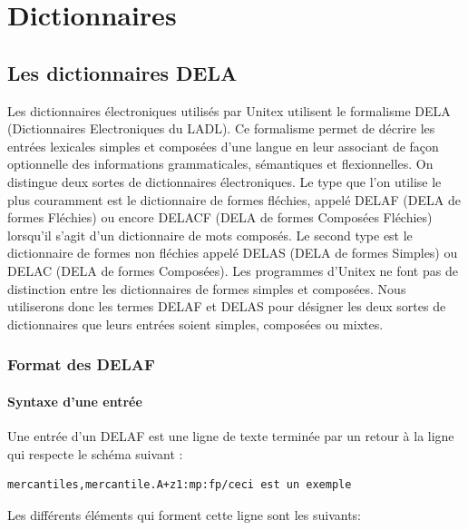 \chapter{Dictionnaires}
\label{chap-dictionaries}

\section{Les dictionnaires DELA}

Les dictionnaires électroniques utilisés par Unitex utilisent le formalisme DELA (Dictionnaires
Electroniques du LADL). Ce formalisme permet de décrire les entrées lexicales simples et composées
 d’une langue en leur associant de façon optionnelle des
informations grammaticales, sémantiques et flexionnelles. On distingue deux sortes de dictionnaires
électroniques. Le type que l’on utilise le plus couramment est le dictionnaire de formes fléchies,
appelé DELAF (DELA de formes Fléchies) ou encore DELACF (DELA de formes Composées
Fléchies) lorsqu’il s’agit d’un dictionnaire de mots composés.
Le second type est le dictionnaire de formes non fléchies appelé DELAS (DELA de formes Simples)
ou DELAC (DELA de formes Composées).
Les programmes d’Unitex ne font pas de distinction entre les dictionnaires de formes
simples et composées. Nous utiliserons donc les termes DELAF et DELAS pour désigner les deux sortes
de dictionnaires que leurs entrées soient simples, composées ou mixtes.

\subsection{Format des DELAF}
\label{section-DELAF-format}
\subsubsection{Syntaxe d’une entrée}
\label{section-DELAF-entry-syntax}
Une entrée d’un DELAF est une ligne de texte terminée par un retour à la ligne qui
respecte le schéma suivant :

\bigskip
\begin{verbatim}
mercantiles,mercantile.A+z1:mp:fp/ceci est un exemple
\end{verbatim}

\bigskip
\noindent Les différents éléments qui forment cette ligne sont les suivants:

